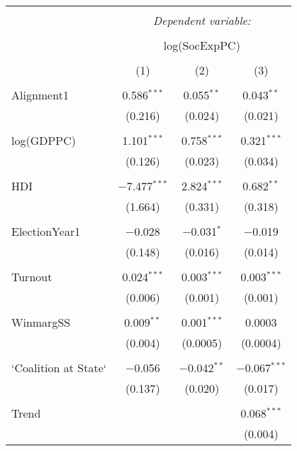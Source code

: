 
\begin{table}[!htbp] \centering 
  \caption{} 
  \label{} 
\begin{tabular}{@{\extracolsep{5pt}}lccc} 
\\[-1.8ex]\hline 
\hline \\[-1.8ex] 
 & \multicolumn{3}{c}{\textit{Dependent variable:}} \\ 
\cline{2-4} 
\\[-1.8ex] & \multicolumn{3}{c}{log(SocExpPC)} \\ 
\\[-1.8ex] & (1) & (2) & (3)\\ 
\hline \\[-1.8ex] 
 Alignment1 & 0.586$^{***}$ & 0.055$^{**}$ & 0.043$^{**}$ \\ 
  & (0.216) & (0.024) & (0.021) \\ 
  & & & \\ 
 log(GDPPC) & 1.101$^{***}$ & 0.758$^{***}$ & 0.321$^{***}$ \\ 
  & (0.126) & (0.023) & (0.034) \\ 
  & & & \\ 
 HDI & $-$7.477$^{***}$ & 2.824$^{***}$ & 0.682$^{**}$ \\ 
  & (1.664) & (0.331) & (0.318) \\ 
  & & & \\ 
 ElectionYear1 & $-$0.028 & $-$0.031$^{*}$ & $-$0.019 \\ 
  & (0.148) & (0.016) & (0.014) \\ 
  & & & \\ 
 Turnout & 0.024$^{***}$ & 0.003$^{***}$ & 0.003$^{***}$ \\ 
  & (0.006) & (0.001) & (0.001) \\ 
  & & & \\ 
 WinmargSS & 0.009$^{**}$ & 0.001$^{***}$ & 0.0003 \\ 
  & (0.004) & (0.0005) & (0.0004) \\ 
  & & & \\ 
 `Coalition at State` & $-$0.056 & $-$0.042$^{**}$ & $-$0.067$^{***}$ \\ 
  & (0.137) & (0.020) & (0.017) \\ 
  & & & \\ 
 Trend &  &  & 0.068$^{***}$ \\ 
  &  &  & (0.004) \\ 

\end{tabular}
\end{table}
